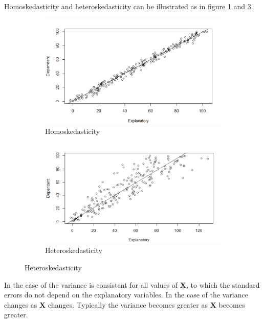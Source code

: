 Homoskedasticity and heteroskedasticity can be illustrated as in figure \ref{fig:homo_with_dependent_up_axis} and \ref{fig:hetero_with_dependent_up_axis}. 
\begin{figure}[H]
\centering
\begin{subfigure}[b]{0.5\textwidth}
    \centering
    \includegraphics[width = \textwidth]{figures/Thea/homoplot.png}
    \caption{Homoskedasticity}
    \label{fig:homo_with_dependent_up_axis}
\end{subfigure}%
\begin{subfigure}[b]{0.5\textwidth}
\centering
    \includegraphics[width = \textwidth]{figures/Thea/Heteroplot.png}
    \caption{Heteroskedasticity}
    \label{fig:hetero_with_dependent_up_axis}
\end{subfigure}
\end{figure}
In the case of \homo the variance is consistent for all values of $\mathbf{X}$, to which the standard errors do not depend on the explanatory variables.
In the case of \hetero the variance changes as $\mathbf{X}$ changes. Typically the variance becomes greater as $\mathbf{X}$ becomes greater.

